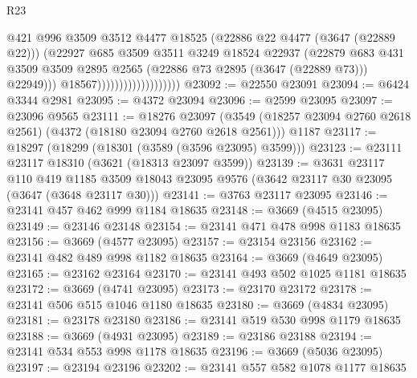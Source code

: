 \begin{lexlean}{R23}
\begin{coremodule}
                                            @421
                                            @996
                                            @3509
                                            @3512
                                            @4477
                                            @18525
                                            (@22886 @22 @4477 (@3647 (@22889 @22)))
                                            (@22927
                                              @685
                                              @3509
                                              @3511
                                              @3249
                                              @18524
                                              @22937
                                              (@22879
                                                @683
                                                @431
                                                @3509
                                                @3509
                                                @2895
                                                @2565
                                                (@22886 @73 @2895 (@3647 (@22889 @73)))
                                                @22949)))
                                          @18567)))))))))))))))))))
@23092 := @22550 @23091
@23094 := @6424 @3344 @2981
@23095 := @4372 @23094
@23096 := @2599 @23095
@23097 := @23096 @9565
@23111 := @18276
    @23097
    (@3549 (@18257 @23094 @2760 @2618 @2561) (@4372 (@18180 @23094 @2760 @2618 @2561)))
    @1187
@23117 := @18297 (@18299 (@18301 (@3589 (@3596 @23095) @3599)))
@23123 := @23111 @23117 @18310 (@3621 (@18313 @23097 @3599))
@23139 := @3631
    @23117
    @110
    @419
    @1185
    @3509
    @18043
    @23095
    @9576
    (@3642 @23117 @30 @23095 (@3647 (@3648 @23117 @30)))
@23141 := @3763 @23117 @23095
@23146 := @23141 @457 @462 @999 @1184 @18635
@23148 := @3669 (@4515 @23095)
@23149 := @23146 @23148
@23154 := @23141 @471 @478 @998 @1183 @18635
@23156 := @3669 (@4577 @23095)
@23157 := @23154 @23156
@23162 := @23141 @482 @489 @998 @1182 @18635
@23164 := @3669 (@4649 @23095)
@23165 := @23162 @23164
@23170 := @23141 @493 @502 @1025 @1181 @18635
@23172 := @3669 (@4741 @23095)
@23173 := @23170 @23172
@23178 := @23141 @506 @515 @1046 @1180 @18635
@23180 := @3669 (@4834 @23095)
@23181 := @23178 @23180
@23186 := @23141 @519 @530 @998 @1179 @18635
@23188 := @3669 (@4931 @23095)
@23189 := @23186 @23188
@23194 := @23141 @534 @553 @998 @1178 @18635
@23196 := @3669 (@5036 @23095)
@23197 := @23194 @23196
@23202 := @23141 @557 @582 @1078 @1177 @18635

\end{coremodule}
\end{lexlean}
